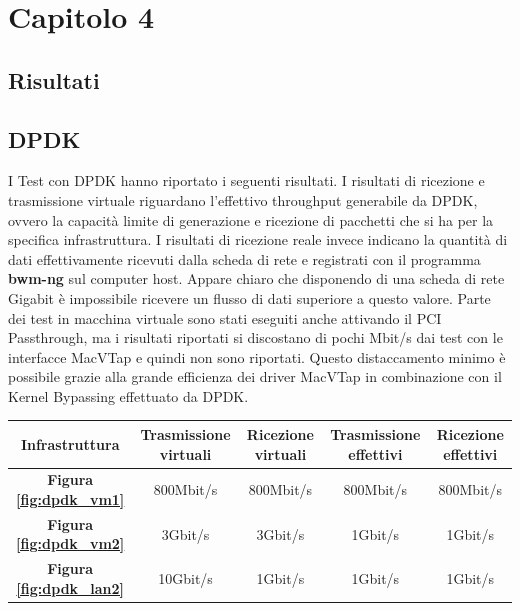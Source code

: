 \chapter*{Capitolo 4}


\section*{Risultati}


\section*{DPDK}
I Test con DPDK hanno riportato i seguenti risultati.
I risultati di ricezione e trasmissione virtuale riguardano l'effettivo throughput generabile da DPDK, ovvero la capacità limite di generazione e ricezione di pacchetti che si ha per la specifica infrastruttura.
I risultati di ricezione reale invece indicano la quantità di dati effettivamente ricevuti dalla scheda di rete e registrati con il programma \textbf{bwm-ng} \cite{noauthor_bwmng} sul computer host. Appare chiaro che disponendo di una scheda di rete Gigabit è impossibile ricevere un flusso di dati superiore a questo valore.
Parte dei test in macchina virtuale sono stati eseguiti anche attivando il PCI Passthrough, ma i risultati riportati si discostano di pochi Mbit/s dai test con le interfacce MacVTap e quindi non sono riportati. Questo distaccamento minimo è possibile grazie alla grande efficienza dei driver MacVTap in combinazione con il Kernel Bypassing effettuato da DPDK.

\vspace{1cm}
\begin{center}
\begin{tabular}[h!]{ |c|c|c|c|c| } 
\hline
\rule{0pt}{4ex}
Infrastruttura & Trasmissione virtuali & Ricezione virtuali & Trasmissione effettivi & Ricezione effettivi \\
\hline
\rule{0pt}{4ex}
\textbf{{Figura \ref{fig:dpdk_vm1}}} & 800Mbit/s & 800Mbit/s & 800Mbit/s & 800Mbit/s \\ 
\hline
\rule{0pt}{4ex}
\textbf{{Figura \ref{fig:dpdk_vm2}}}& 3Gbit/s & 3Gbit/s & 1Gbit/s & 1Gbit/s\\ 
\hline
\rule{0pt}{4ex}
\textbf{{Figura \ref{fig:dpdk_lan2}}} & 10Gbit/s & 1Gbit/s & 1Gbit/s & 1Gbit/s\\
\hline
\end{tabular}
\end{center}
\vspace{1cm}

